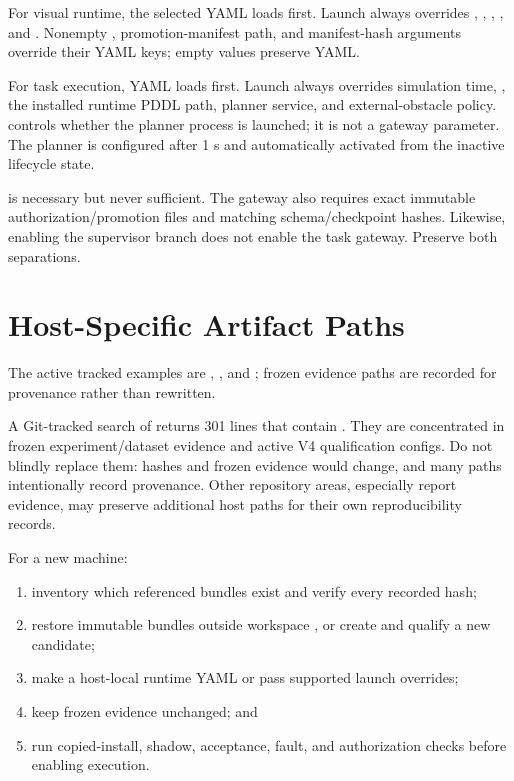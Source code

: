 For visual runtime, the selected YAML loads first. Launch always overrides
, , ,
, and . Nonempty
, promotion-manifest path, and manifest-hash arguments
override their YAML keys; empty values preserve YAML.

For task execution, YAML loads first. Launch always overrides simulation time,
, the installed runtime PDDL path, planner service, and
external-obstacle policy.  controls whether the planner
process is launched; it is not a gateway parameter. The planner is configured
after 1 s and automatically activated from the inactive lifecycle state.

\begin{safetybox}
 is necessary but never sufficient. The gateway
also requires exact immutable authorization/promotion files and matching
schema/checkpoint hashes. Likewise, enabling the supervisor branch does not
enable the task gateway. Preserve both separations.
\end{safetybox}

\section{Host-Specific Artifact Paths}

The active tracked examples are
,
,
and ;
frozen evidence paths are recorded for provenance rather than rewritten.

A Git-tracked search of  returns 301 lines that
contain . They are concentrated in frozen experiment/dataset
evidence and active V4 qualification configs. Do not blindly replace them:
hashes and frozen evidence would change, and many paths intentionally record
provenance. Other repository areas, especially report evidence, may preserve
additional host paths for their own reproducibility records.

For a new machine:

\begin{enumerate}
  \item inventory which referenced bundles exist and verify every recorded hash;
  \item restore immutable bundles outside workspace , or create and
        qualify a new candidate;
  \item make a host-local runtime YAML or pass supported launch overrides;
  \item keep frozen evidence unchanged; and
  \item run copied-install, shadow, acceptance, fault, and authorization checks
        before enabling execution.
\end{enumerate}

